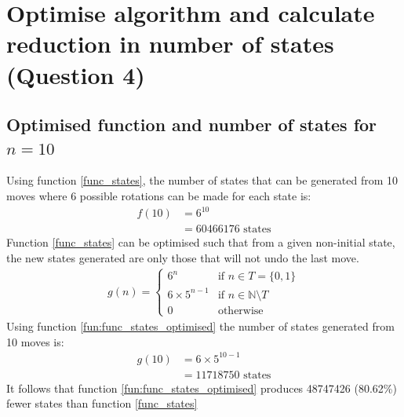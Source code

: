 \documentclass[]{article}
\begin{document}
\section{Optimise algorithm and calculate reduction in number of states (Question 4)}
\subsection{Optimised function and number of states for \(n = 10\)}
Using function \ref{func_states}, the number of states that can be generated from 10 moves where 6 possible rotations can be made for each state is:
\begin{equation*}
\begin{split}
  f(10) & = 6^{10} \\
		  & = 60466176\text{ states}
\end{split}
\end{equation*}								
Function \ref{func_states} can be optimised such that from a given non-initial state, the new states generated are only those that will not undo the last move.
\begin{equation}
\begin{split}
g(n) =
\begin{cases}
	6^{n} & \text{if }n \in T = \{0, 1\}\\
	6 \times 5^{n-1} & \text{if }n \in \mathbb{N} \setminus T\\
	0 & \text{otherwise}
\end{cases}
\end{split}
\label{fun:func_states_optimised}
\end{equation}
Using function \ref{fun:func_states_optimised} the number of states generated from 10 moves is:
\begin{equation*}
\begin{split}
  g(10) & = 6 \times 5^{10-1} \\
		  & = 11718750\text{ states}
\end{split}
\end{equation*}
It follows that function \ref{fun:func_states_optimised} produces 48747426 (80.62\%) fewer states than function \ref{func_states}
\end{document}
